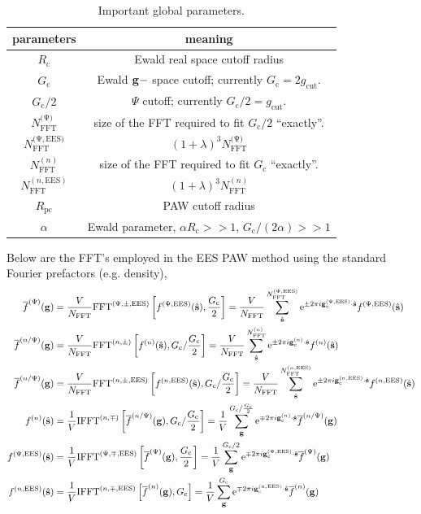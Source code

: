 \documentclass[paper=a4, fontsize=11pt]{article} %
\numberwithin{equation}{section} %
\numberwithin{figure}{section} %
\numberwithin{table}{section} %
\newcommand{\ol}{\overline}
\newcommand{\bs}{{\bf{s}}}
\newcommand{\bg}{{\bf{g}}}
\newcommand{\hs}{{\hat{\bf{s}}}}
\newcommand{\rEES}{{\mathrm{EES}}}
\newcommand{\rcut}{{\mathrm{cut}}}
\newcommand{\re}{{\mathrm{e}}}
\newcommand{\gcn}{{\bg_c^{(n)}}}
\newcommand{\gcpEES}{{\bg_c^{(\Psi,\rEES)}}}
\newcommand{\gcnEES}{{\bg_c^{(n,\rEES)}}}
\newcommand{\igcns}{2\pi i\gcn\cdot\hat \bs}
\newcommand{\igcps}{2\pi i\gcpEES\cdot\hat \bs}
\newcommand{\igcnEESs}{2\pi i\gcnEES\cdot\hat \bs}
\newcommand{\al}{{\alpha}}
\newcommand{\NFFT}{{N_{\mathrm{FFT}}}}
\newcommand{\NFFTn}{{N^{(n)}_{\mathrm{FFT}}}}
\newcommand{\NFFTp}{{N^{\mathrm{(\Psi})}_{\mathrm{FFT}}}}
\newcommand{\NFFTnEES}{{N^{(n,\rEES)}_{\mathrm{FFT}}}}
\newcommand{\NFFTpEES}{{N^{\mathrm{(\Psi,\rEES})}_{\mathrm{FFT}}}}
\newcommand{\Rc}{{R_{\mathrm{c}}}}
\newcommand{\Gc}{{G_{\mathrm{c}}}}
\newcommand{\hGc}{{\frac{G_{\mathrm{c}}}{2}}}
\newcommand{\Rpc}{{R_{\mathrm{pc}}}}
\newcommand{\FFTnm}{{\mathrm{FFT}^{(n,\pm)}}}
\newcommand{\FFTnmEES}{{\mathrm{FFT}^{(n,\pm,\rEES)}}}
\newcommand{\FFTpmEES}{{\mathrm{FFT}^{(\Psi,\pm,\rEES)}}}
\newcommand{\IFFTnm}{{\mathrm{IFFT}^{(n,\mp)}}}
\newcommand{\IFFTnmEES}{{\mathrm{IFFT}^{(n,\mp,\rEES)}}}
\newcommand{\IFFTpmEES}{{\mathrm{IFFT}^{(\Psi,\mp,\rEES)}}}
\begin{document}
\begin{table}[!htbp]
\caption{\label{index1} Important global parameters.}
\begin{center}
\begin{tabular}{ c c}
  \hline\hline
  parameters & meaning \\
  \hline
  $\Rc$ & Ewald real space cutoff radius \\
  $\Gc$ & Ewald $\bg-$ space cutoff; currently $\Gc = 2g_\rcut$. \\
  $\Gc/2$ & $\Psi$ cutoff; currently $\Gc/2 = g_\rcut$. \\
  $\NFFTp$ & size of the FFT required to fit $\Gc/2$ ``exactly''.\\
  $\NFFTpEES$ & $(1+\lambda)^3\NFFTp$ \\
  $\NFFTn$ & size of the FFT required to fit $\Gc$ ``exactly''.\\
  $\NFFTnEES$ & $(1+\lambda)^3\NFFTn$ \\
  $\Rpc$ & PAW cutoff radius \\
  $\alpha$ & Ewald parameter, $\al \Rc >> 1$, $\Gc/(2\al) >> 1$ \\
  \hline\hline
\end{tabular}
\end{center}
\end{table}
Below are the FFT's employed in the EES PAW method using the standard Fourier prefactors (e.g. density),
\begin{equation}\label{eq:FFTdef}
\begin{split}
\ol f^{(\Psi)}(\bg) &= \frac{V}{\NFFT}\FFTpmEES \left[f^{(\Psi,\rEES)}(\hs),\hGc\right]= \frac{V}{\NFFT}\sum_{\hs}^\NFFTpEES \re^{\pm \igcps} f^{(\Psi,\rEES)}(\hs)\\
\ol f^{(n/\Psi)}(\bg) &= \frac{V}{\NFFT}\FFTnm \left[f^{(n)}(\hs),\Gc/\hGc\right]= \frac{V}{\NFFT}\sum_{\hs}^\NFFTn \re^{\pm\igcns} f^{(n)}(\hs)\\
\ol f^{(n/\Psi)}(\bg) &= \frac{V}{\NFFT}\FFTnmEES \left[f^{(n,\rEES)}(\hs),\Gc/\hGc\right]= \frac{V}{\NFFT}\sum_{\hs}^\NFFTnEES \re^{\pm\igcnEESs} f^{(n,\rEES)}(\hs)\\
f^{(n)}(\hs) &= \frac{1}{V}\IFFTnm\left[\ol f^{(n/\Psi)}(\bg),\Gc/\hGc\right]=\frac{1}{V}\sum_{\bg}^{\Gc/\hGc} \re^{\mp\igcns} \ol f^{(n/\Psi)}(\bg)\\
f^{(\Psi,\rEES)}(\hs) &= \frac{1}{V}\IFFTpmEES\left[\ol f^{(\Psi)}(\bg),\hGc\right]=\frac{1}{V}\sum_{\bg}^{\Gc/2} \re^{\mp\igcps} \ol f^{(\Psi)}(\bg)\\
f^{(n,\rEES)}(\hs) &= \frac{1}{V}\IFFTnmEES\left[\ol f^{(n)}(\bg),\Gc\right]=\frac{1}{V}\sum_{\bg}^{\Gc} \re^{\mp\igcnEESs} \ol f^{(n)}(\bg)\\
\end{split}
\end{equation}
\end{document}
